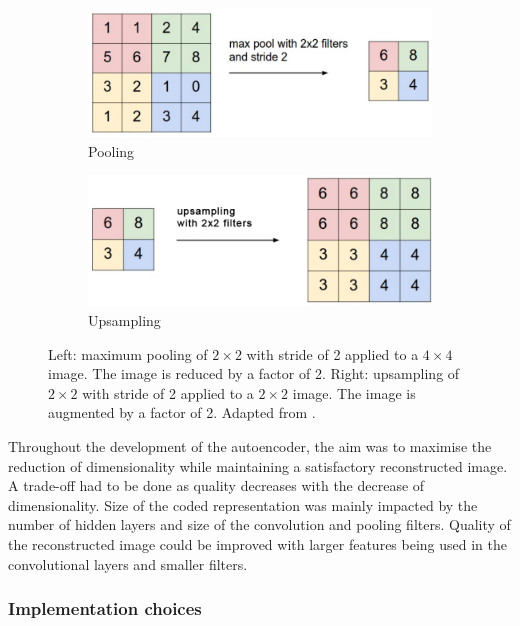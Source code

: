 \begin{figure}[h!]
    \centering
    \begin{subfigure}{0.45\textwidth}
        \includegraphics[width=\textwidth]{dissertation/figures/pooling_operation.png}
        \caption{Pooling}
    \end{subfigure}
    \begin{subfigure}{0.45\textwidth}
        \includegraphics[width=\textwidth]{dissertation/figures/upsampling_operation.png}
        \caption{Upsampling}
    \end{subfigure}
    \caption{Left: maximum pooling of $2\times2$ with stride of 2 applied to a $4\times4$ image. The image is reduced by a factor of 2. Right: upsampling of $2\times2$ with stride of 2 applied to a $2\times2$ image. The image is augmented by a factor of 2. Adapted from \citet{karpath_cs231n}.}
    \label{fig:sampling}
\end{figure}

Throughout the development of the autoencoder, the aim was to maximise the reduction of dimensionality while maintaining a satisfactory reconstructed image. A trade-off had to be done as quality decreases with the decrease of dimensionality. Size of the coded representation was mainly impacted by the number of hidden layers and size of the convolution and pooling filters. Quality of the reconstructed image could be improved with larger features being used in the convolutional layers and smaller filters.

\bigskip
\subsubsection{Implementation choices}
\hfill
\hfill

